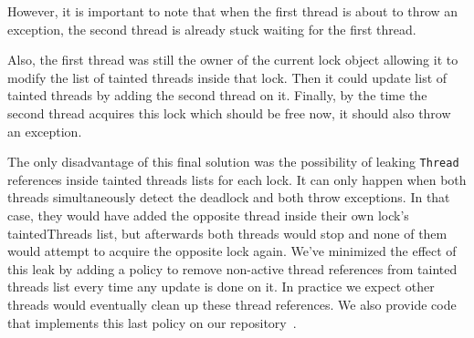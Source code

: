 However, it is important to note that when the first thread is about to throw an exception,
the second thread is already stuck waiting for the first thread.

Also, the first thread was still the owner of the current lock object allowing it to modify the list of tainted threads inside that lock.
Then it could update list of tainted threads by adding the second thread on it.
Finally, by the time the second thread acquires this lock which should be free now, it should also throw an exception.

The only disadvantage of this final solution was the possibility of leaking {\tt Thread} references inside tainted threads lists for each lock.
It can only happen when both threads simultaneously detect the deadlock and both throw exceptions.
In that case, they would have added the opposite thread inside their own lock's taintedThreads list, but afterwards
both threads would stop and none of them would attempt to acquire the opposite lock again.
We've minimized the effect of this leak by adding a policy to remove non-active thread
references from tainted threads list every time any update is done on it.
In practice we expect other threads would eventually clean up these thread references.
We also provide code that implements this last policy on our repository~\cite{repo}.
